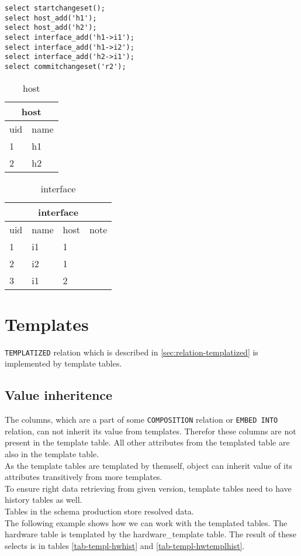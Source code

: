 \documentclass[deska]{subfiles}
\begin{document}
\begin{verbatim}
select startchangeset();
select host_add('h1');
select host_add('h2');
select interface_add('h1->i1');
select interface_add('h1->i2');
select interface_add('h2->i1');
select commitchangeset('r2');
\end{verbatim}

\begin{center}

\begin{table}
    \caption{host}
    \label{tab-embed-host}
\begin{tabular}{ | l | l | }
    \hline
    \multicolumn{2}{|c|}{host}\\
    \hline
    uid & name \\
    \hline
    1 & h1\\
    2 & h2\\
    \hline
\end{tabular}
\end{table}

\begin{table}
    \caption{interface}
    \label{tab-embed-interface}
\begin{tabular}{ | l | l | l | l | }
    \hline
    \multicolumn{4}{|c|}{interface}\\
    \hline
    uid & name & host & note\\
    \hline
    1 & i1 & 1 & \\
    2 & i2 & 1 & \\
    3 & i1 & 2 & \\
    \hline
\end{tabular}
\end{table}

\end{center}

\section{Templates}
{\tt TEMPLATIZED} relation which is described in \ref{sec:relation-templatized} is implemented by template tables. 

\subsection{Value inheritence}
The columns, which are a part of some {\tt COMPOSITION} relation or {\tt EMBED INTO} relation, can not inherit its value from templates. Therefor these columns are not present in the template table. All other attributes from the templated table are also in the template table.\\
As the template tables are templated by themself, object can inherit value of its attributes transitively from more templates.\\
To ensure right data retrieving from given version, template tables need to have history tables as well.\\
Tables in the schema production store resolved data.\\
The following example shows how we can work with the templated tables. The hardware table is templated by the hardware\_template table. The result of these selects is in tables \ref{tab-templ-hwhist} and \ref{tab-templ-hwtemplhist}.
\end{document}
